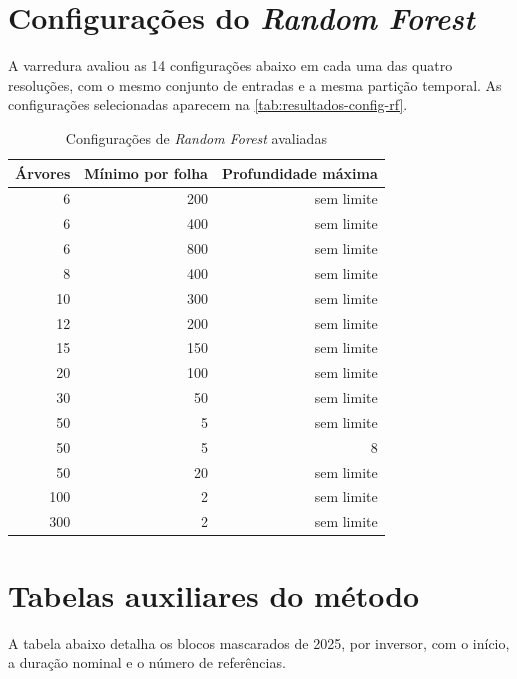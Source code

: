 \chapter{Configurações do \textit{Random Forest}}
\label{ap:config-rf}

A varredura avaliou as 14 configurações abaixo em cada uma das quatro
resoluções, com o mesmo conjunto de entradas e a mesma partição temporal.
As configurações selecionadas aparecem na
\cref{tab:resultados-config-rf}.

\begin{table}[htbp]
\centering\small
\caption{Configurações de \textit{Random Forest} avaliadas}
\label{tab:ap-config-rf}
\begin{tabular}{rrr}
\toprule
Árvores & Mínimo por folha & Profundidade máxima \\
\midrule
6 & 200 & sem limite \\
6 & 400 & sem limite \\
6 & 800 & sem limite \\
8 & 400 & sem limite \\
10 & 300 & sem limite \\
12 & 200 & sem limite \\
15 & 150 & sem limite \\
20 & 100 & sem limite \\
30 & 50 & sem limite \\
50 & 5 & sem limite \\
50 & 5 & 8 \\
50 & 20 & sem limite \\
100 & 2 & sem limite \\
300 & 2 & sem limite \\
\bottomrule
\end{tabular}
\end{table}

\chapter{Tabelas auxiliares do método}
\label{ap:tabelas-metodo}

A tabela abaixo detalha os blocos mascarados de 2025, por inversor, com o
início, a duração nominal e o número de referências.

